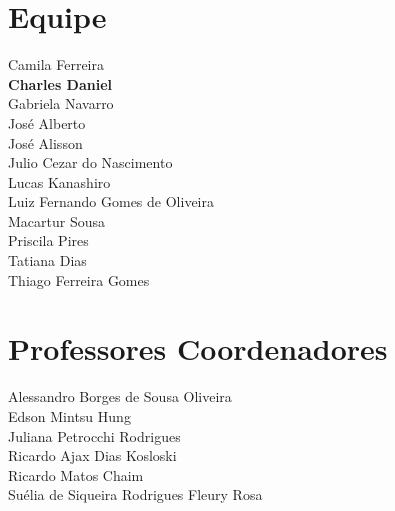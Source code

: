 \begin{center}

\chapter*{Equipe}

Camila Ferreira \\
\textbf{Charles Daniel} \\
Gabriela Navarro \\
José Alberto \\
José Alisson \\
Julio Cezar do Nascimento \\
Lucas Kanashiro \\
Luiz Fernando Gomes de Oliveira \\
Macartur Sousa \\
Priscila Pires \\
Tatiana Dias \\
Thiago Ferreira Gomes

\vspace{3cm}

\let\clearpage\relax
\chapter*{Professores Coordenadores}

Alessandro Borges de Sousa Oliveira \\
Edson Mintsu Hung \\
Juliana Petrocchi Rodrigues \\
Ricardo Ajax Dias Kosloski \\
Ricardo Matos Chaim  \\
Suélia de Siqueira Rodrigues Fleury Rosa 

\end{center}

\newpage
